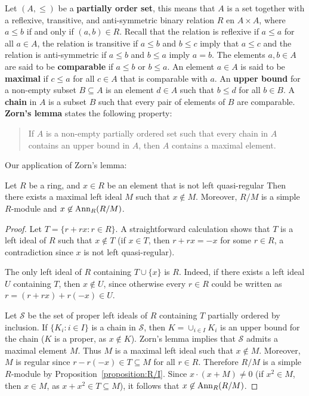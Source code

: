 Let $(A,\leq)$ be a \textbf{partially order set}, this means that $A$ is a set together with a 
reflexive, transitive, and anti-symmetric binary relation
$R$ en $A\times A$, where $a\leq b$ if and only if $(a,b)\in R$. 
Recall that the relation is reflexive if $a\leq a$ for all $a\in A$, the relation is transitive if 
$a\leq b$ and $b\leq c$ imply that 
$a\leq c$ and the relation is anti-symmetric if $a\leq b$ and $b\leq a$ imply $a=b$.
The elements $a,b\in A$ are said to be \textbf{comparable} if $a\leq b$ or $b\leq
a$. An element $a\in A$ is said to be \textbf{maximal} if 
$c\leq a$ 
for all $c\in A$
that is comparable with $a$. 
An \textbf{upper bound} for a non-empty subset $B\subseteq A$ is an element $d\in
A$ such that $b\leq d$ for all $b\in B$. A \textbf{chain} in $A$ is a subset 
$B$ such that every pair of elements of $B$ are comparable. 
\textbf{Zorn's lemma} states the following property: 
\begin{quote}
If $A$ is a non-empty partially ordered set such that every chain in 
$A$ contains an upper bound in $A$, then $A$ contains a maximal element. 
\end{quote}

Our application of Zorn's lemma:

\begin{lemma}
	\label{lemma:maxreg}
	Let $R$ be a ring, and $x\in R$ be an element that is not left quasi-regular Then there
	exists a maximal left ideal $M$ such that 
	$x\not\in M$. Moreover, $R/M$ is a simple $R$-module and 
	$x\not\in\operatorname{Ann}_R(R/M)$.
\end{lemma}

\begin{proof}
	Let $T=\{r+rx:r\in R\}$. A straightforward calculation shows that $T$ is a left ideal of 
	$R$ such that $x\not\in T$ (if $x\in T$, then $r+rx=-x$ for some 
	$r\in R$, a contradiction since $x$ is not left quasi-regular). 

	The only left ideal of $R$ containing 
	$T\cup\{x\}$ is $R$. Indeed, if there exists a left ideal $U$ containing $T$, then 
    $x\not\in U$, since otherwise every $r\in R$ could be written as 
	$r=(r+rx)+r(-x)\in U$. 

	Let $\mathcal{S}$ be the set of proper left ideals of $R$ containing 
	$T$ partially ordered by inclusion. If $\{K_i:i\in I\}$ is a chain in 
	$\mathcal{S}$, then $K=\cup_{i\in I}K_i$ is an upper bound for the chain 
	($K$ is a proper, as $x\not\in K$). Zorn's lemma implies that 
	$\mathcal{S}$ admits a maximal element $M$. Thus $M$
	is a maximal left ideal such that $x\not\in M$. Moreover, $M$ is regular
	since $r-r(-x)\in T\subseteq M$ for all $r\in R$. Therefore $R/M$ is a simple 
	$R$-module by Proposition~\ref{proposition:R/I}. Since $x\cdot (x+M)\ne
	0$ (if $x^2\in M$, then  $x\in M$, as $x+x^2\in
	T\subseteq M$), it follows that $x\not\in\operatorname{Ann}_R(R/M)$.
\end{proof}

